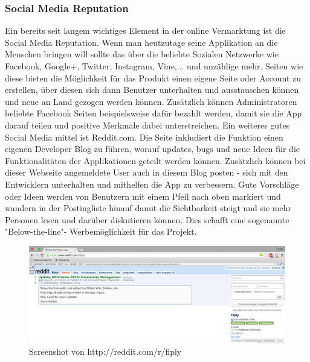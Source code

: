 \documentclass[FIPLY_base.tex]{subfiles}
\begin{document}
\subsubsection{Social Media Reputation}
Ein bereits seit langem wichtiges Element in der online Vermarktung ist die Social Media Reputation. Wenn man heutzutage seine Applikation an die Menschen bringen will sollte das über die beliebte Sozialen Netzwerke wie Facebook, Google+, Twitter, Instagram, Vine,... und unzählige mehr. Seiten wie diese bieten die Möglichkeit für das Produkt einen eigene Seite oder Account zu erstellen, über diesen sich dann Benutzer unterhalten und ausstauschen können und neue an Land gezogen werden können. Zusätzlich können Administratoren beliebte Facebook Seiten beispielsweise dafür bezahlt werden, damit sie die App darauf teilen und positive Merkmale dabei unterstreichen. 
\newline
Ein weiteres gutes Social Media mittel ist Reddit.com. Die Seite inkludiert die Funktion einen eigenen Developer Blog zu führen, worauf updates, bugs und neue Ideen für die Funktionalitäten der Applikationen geteilt werden können. Zusätzlich können bei dieser Webseite angemeldete User auch in diesem Blog posten - sich mit den Entwicklern unterhalten und mithelfen die App zu verbessern. Gute Vorschläge oder Ideen werden von Benutzern mit einem Pfeil nach oben markiert und wandern in der Postingliste hinauf damit die Sichtbarkeit steigt und sie mehr Personen lesen und darüber diskutieren können. Dies schafft eine sogenannte "Below-the-line"- Werbemöglichkeit für das Projekt.

\begin{figure}[H]
	\centering
	\includegraphics[scale=0.28]{img/fiplysubredditscreenshot}
	\caption{Screenshot von http://reddit.com/r/fiply}
\end{figure}
\end{document}
